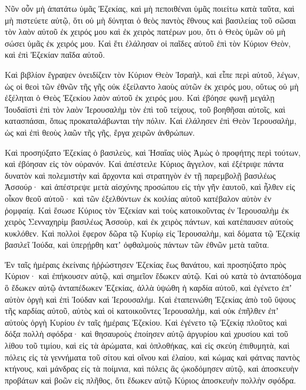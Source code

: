 {Νῦν οὖν μὴ ἀπατάτω ὑμᾶς Ἐζεκίας, καὶ μὴ πεποιθέναι ὑμᾶς ποιείτω κατὰ ταῦτα, καὶ μὴ πιστεύετε αὐτῷ, ὅτι οὐ μὴ δύνηται ὁ θεὸς παντὸς ἔθνους καὶ βασιλείας τοῦ σῶσαι τὸν λαὸν αὐτοῦ ἐκ χειρός μου καὶ ἐκ χειρὸς πατέρων μου, ὅτι ὁ Θεὸς ὑμῶν οὐ μὴ σώσει ὑμᾶς ἐκ χειρός μου.
Καὶ ἔτι ἐλάλησαν οἱ παῖδες αὐτοῦ ἐπὶ τὸν Κύριον Θεὸν, καὶ ἐπὶ Ἐζεκίαν παῖδα αὐτοῦ.
\par }{\PP {}Καὶ βιβλίον ἔγραψεν ὀνειδίζειν τὸν Κύριον Θεὸν Ἰσραὴλ, καὶ εἶπε περὶ αὐτοῦ, λέγων, ὡς οἱ θεοὶ τῶν ἐθνῶν τῆς γῆς οὐκ ἐξείλαντο λαοὺς αὐτῶν ἐκ χειρός μου, οὕτως οὐ μὴ ἐξέληται ὁ Θεὸς Ἐζεκίου λαὸν αὐτοῦ ἐκ χειρός μου.
Καὶ ἐβόησε φωνῇ μεγάλῃ Ἰουδαϊστὶ ἐπὶ τὸν λαὸν Ἱερουσαλὴμ τὸν ἐπὶ τοῦ τείχους, τοῦ βοηθῆσαι αὐτοῖς, καὶ κατασπάσαι, ὅπως προκαταλάβωνται τὴν πόλιν.
Καὶ ἐλάλησεν ἐπὶ Θεὸν Ἱερουσαλὴμ, ὡς καὶ ἐπὶ θεοὺς λαῶν τῆς γῆς, ἔργα χειρῶν ἀνθρώπων.
\par }{\PP {}Καὶ προσηύξατο Ἐζεκίας ὁ βασιλεὺς, καὶ Ἡσαΐας υἱὸς Ἀμὼς ὁ προφήτης περὶ τούτων, καὶ ἐβόησαν εἰς τὸν οὐρανόν.
Καὶ ἀπέστειλε Κύριος ἄγγελον, καὶ ἐξέτριψε πάντα δυνατὸν καὶ πολεμιστὴν καὶ ἄρχοντα καὶ στρατηγὸν ἐν τῇ παρεμβολῇ βασιλέως Ἀσσούρ· καὶ ἀπέστρεψε μετὰ αἰσχύνης προσώπου εἰς τὴν γῆν ἑαυτοῦ, καὶ ἦλθεν εἰς οἶκον θεοῦ αὐτοῦ· καὶ τῶν ἐξελθόντων ἐκ κοιλίας αὐτοῦ κατέβαλον αὐτὸν ἐν ῥομφαίᾳ.
Καὶ ἔσωσε Κύριος τὸν Ἐζεκίαν καὶ τοὺς κατοικοῦντας ἐν Ἱερουσαλὴμ ἐκ χειρὸς Σενναχηρὶμ βασιλέως Ἀσσοὺρ, καὶ ἐκ χειρὸς πάντων, καὶ κατέπαυσεν αὐτοὺς κυκλόθεν.
Καὶ πολλοὶ ἔφερον δῶρα τῷ Κυρίῳ εἰς Ἱερουσαλὴμ, καὶ δόματα τῷ Ἐζεκίᾳ βασιλεῖ Ἰούδα, καὶ ὑπερῄρθη κατʼ ὀφθαλμοὺς πάντων τῶν ἐθνῶν μετὰ ταῦτα.
\par }{\PP {}Ἐν ταῖς ἡμέραις ἐκείναις ἠῤῥώστησεν Ἐζεκίας ἕως θανάτου, καὶ προσηύξατο πρὸς Κύριον· καὶ ἐπήκουσεν αὐτῷ, καὶ σημεῖον ἔδωκεν αὐτῷ.
Καὶ οὐ κατὰ τὸ ἀνταπόδομα ὃ ἔδωκεν αὐτῷ ἀνταπέδωκεν Ἐζεκίας, ἀλλὰ ὑψώθη ἡ καρδία αὐτοῦ, καὶ ἐγένετο ἐπʼ αὐτὸν ὀργὴ καὶ ἐπὶ Ἰούδαν καὶ Ἱερουσαλήμ.
Καὶ ἐταπεινώθη Ἐζεκίας ἀπὸ τοῦ ὕψους τῆς καρδίας αὐτοῦ, αὐτὸς καὶ οἱ κατοικοῦντες Ἱερουσαλὴμ, καὶ οὐκ ἐπῆλθεν ἐπʼ αὐτοὺς ὀργὴ Κυρίου ἐν ταῖς ἡμέραις Ἐζεκίου.
Καὶ ἐγένετο τῷ Ἐζεκίᾳ πλοῦτος καὶ δόξα πολλὴ σφόδρα· καὶ θησαυροὺς ἐποίησεν αὐτῷ ἀργυρίου καὶ χρυσίου καὶ τοῦ λίθου τοῦ τιμίου, καὶ εἰς τὰ ἀρώματα, καὶ ὁπλοθήκας, καὶ εἰς σκεύη ἐπιθυμητὰ,
καὶ πόλεις εἰς τὰ γεννήματα τοῦ σίτου καὶ οἴνου καὶ ἐλαίου, καὶ κώμας καὶ φάτνας παντὸς κτήνους, καὶ μάνδρας εἰς τὰ ποίμνια,
καὶ πόλεις ἃς ᾠκοδόμησεν αὐτῷ, καὶ ἀποσκευὴν προβάτων καὶ βοῶν εἰς πλῆθος, ὅτι ἔδωκεν αὐτῷ Κύριος ἀποσκευὴν πολλὴν σφόδρα.
}
